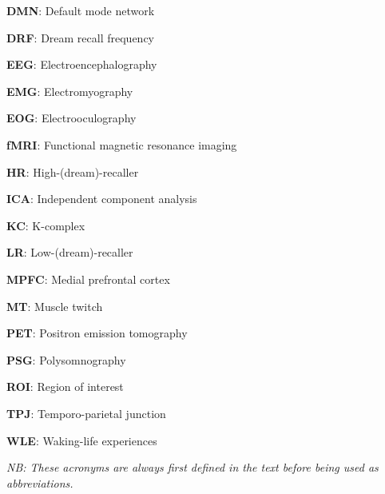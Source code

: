\label{sec:acronyms}
\vspace*{-10mm}
\setlength{\columnsep}{1.25cm}
\begin{multicols}{2}

\textbf{DMN}: Default mode network

\textbf{DRF}: Dream recall frequency

\textbf{EEG}: Electroencephalography

\textbf{EMG}: Electromyography

\textbf{EOG}: Electrooculography

\textbf{fMRI}: Functional magnetic resonance imaging

\textbf{HR}: High-(dream)-recaller

\textbf{ICA}: Independent component analysis

\textbf{KC}: K-complex

\textbf{LR}: Low-(dream)-recaller

\textbf{MPFC}: Medial prefrontal cortex

\textbf{MT}: Muscle twitch

\textbf{PET}: Positron emission tomography

\textbf{PSG}: Polysomnography

\textbf{ROI}: Region of interest

\textbf{TPJ}: Temporo-parietal junction

\textbf{WLE}: Waking-life experiences
\end{multicols}

\textit{NB: These acronyms are always first defined in the text before being used as abbreviations.}
